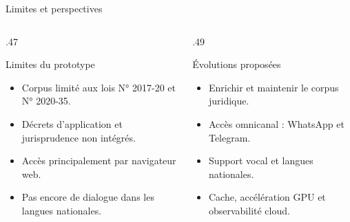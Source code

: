 \documentclass[aspectratio=169,10pt]{beamer}
\begin{document}
\begin{frame}{Limites et perspectives}
  \begin{columns}[T,onlytextwidth]
    \begin{column}{.47\textwidth}
      \begin{block}{Limites du prototype}
        \begin{itemize}\setlength\itemsep{0.3em}
          \item Corpus limité aux lois N° 2017-20 et N° 2020-35.
          \item Décrets d'application et jurisprudence non intégrés.
          \item Accès principalement par navigateur web.
          \item Pas encore de dialogue dans les langues nationales.
        \end{itemize}
      \end{block}
    \end{column}
    \begin{column}{.49\textwidth}
      \begin{block}{Évolutions proposées}
        \begin{itemize}\setlength\itemsep{0.3em}
          \item Enrichir et maintenir le corpus juridique.
          \item Accès omnicanal : WhatsApp et Telegram.
          \item Support vocal et langues nationales.
          \item Cache, accélération GPU et observabilité cloud.
        \end{itemize}
      \end{block}
    \end{column}
  \end{columns}
\end{frame}
\end{document}
